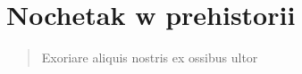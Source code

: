 \chapter{Nochetak w prehistorii}

\begin{quote}
    Exoriare aliquis nostris ex ossibus ultor
\end{quote} 
